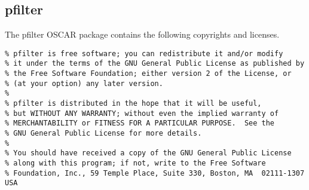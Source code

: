 %
%
%

\subsection{pfilter}
The pfilter OSCAR package contains the following copyrights and licenses.

\begin{verbatim}
% pfilter is free software; you can redistribute it and/or modify
% it under the terms of the GNU General Public License as published by
% the Free Software Foundation; either version 2 of the License, or
% (at your option) any later version.
%
% pfilter is distributed in the hope that it will be useful,
% but WITHOUT ANY WARRANTY; without even the implied warranty of
% MERCHANTABILITY or FITNESS FOR A PARTICULAR PURPOSE.  See the
% GNU General Public License for more details.
%
% You should have received a copy of the GNU General Public License
% along with this program; if not, write to the Free Software
% Foundation, Inc., 59 Temple Place, Suite 330, Boston, MA  02111-1307  USA
\end{verbatim}

